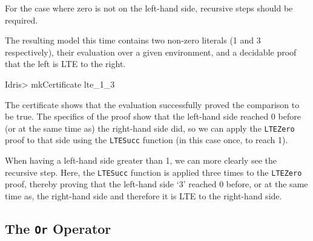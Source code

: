         \newpage
        
        
        
        For the case where zero is not on the left-hand side, recursive steps should be required.
        
        
        The resulting model this time contains two non-zero literals (1 and 3 respectively), their evaluation over a given environment, and a decidable proof that the left is LTE to the right.
        
        \begin{code}
            Idris> mkCertificate lte_1_3
        \end{code}
        
        The certificate shows that the evaluation successfully proved the comparison to be true. The specifics of the proof show that the left-hand side reached 0 before (or at the same time as) the right-hand side did, so we can apply the \texttt{LTEZero} proof to that side using the \texttt{LTESucc} function (in this case once, to reach 1).
        
        
        When having a left-hand side greater than 1, we can more clearly see the recursive step. Here, the \texttt{LTESucc} function is applied three times to the \texttt{LTEZero} proof, thereby proving that the left-hand side `3' reached 0 before, or at the same time as, the right-hand side and therefore it is LTE to the right-hand side.
        
        
    
    \subsection{The \texttt{Or} Operator}\label{evaln:ops:or}
        
    
        
    
        
        
